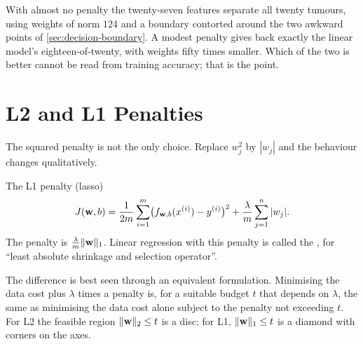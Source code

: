 With almost no penalty the twenty-seven features separate all twenty tumours,
using weights of norm $124$ and a boundary contorted around the two awkward
points of \cref{sec:decision-boundary}. A modest penalty gives back exactly the
linear model's eighteen-of-twenty, with weights fifty times smaller. Which of
the two is better cannot be read from training accuracy; that is the point.

\section{L2 and L1 Penalties}
\label{sec:l1-l2}

The squared penalty is not the only choice. Replace $w_j^2$ by $|w_j|$ and the
behaviour changes qualitatively.

\begin{defbox}{The L1 penalty (lasso)}
\[
  J(\mathbf{w},b) = \frac{1}{2m}\sum_{i=1}^{m}\bigl(f_{\mathbf{w},b}(x^{(i)})-y^{(i)}\bigr)^2
           + \frac{\lambda}{m}\sum_{j=1}^{n}|w_j| .
\]
The penalty is $\frac{\lambda}{m}\|\mathbf{w}\|_1$. Linear regression with this penalty
is called the , for ``least absolute shrinkage and selection
operator''.
\end{defbox}

The difference is best seen through an equivalent formulation. Minimising the
data cost plus $\lambda$ times a penalty is, for a suitable budget $t$ that
depends on $\lambda$, the same as minimising the data cost alone subject to the
penalty not exceeding $t$. For L2 the feasible region $\|\mathbf{w}\|_2 \le t$ is a
disc; for L1, $\|\mathbf{w}\|_1 \le t$ is a diamond with corners on the axes.

